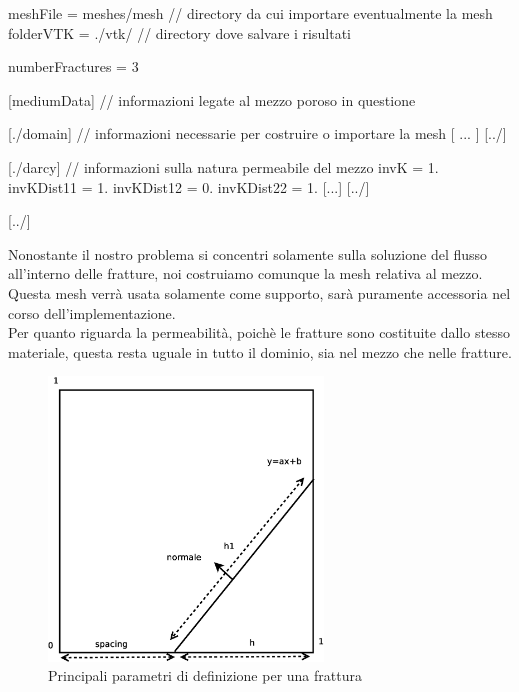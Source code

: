 \begin{Code03_01}[caption={Definizione del dominio}]
meshFile = meshes/mesh		//   directory da cui importare eventualmente la mesh
folderVTK = ./vtk/				//   directory dove salvare i risultati

numberFractures = 3

[mediumData]					//   informazioni legate al mezzo poroso in questione

   [./domain]					//   informazioni necessarie per costruire o importare la mesh 
     [ ... ]
   [../]

   [./darcy]					//   informazioni sulla natura permeabile del mezzo
     invK = 1.
     invKDist11 = 1.
     invKDist12 = 0.
     invKDist22 = 1.
     [...]	
   [../]

[../]

\end{Code03_01}

\par \noindent Nonostante il nostro problema si concentri solamente sulla soluzione del flusso all'interno delle fratture, noi costruiamo comunque la mesh relativa al mezzo. Questa mesh verrà usata solamente come supporto, sarà puramente accessoria nel corso dell'implementazione. \\
 \noindent Per quanto riguarda la permeabilità, poichè le fratture sono costituite dallo stesso materiale, questa resta uguale in tutto il dominio, sia nel mezzo che nelle fratture. 

\begin{figure}[htbp]
\begin{center}
\includegraphics[width=0.65\textwidth]{img/mesh.eps}
\caption{Principali parametri di definizione per una frattura}
\end{center}
\end{figure}

